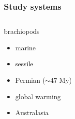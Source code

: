 \documentclass{beamer}
\begin{document}
\begin{frame}
  \frametitle{Study systems}

  \begin{columns}
    \begin{column}{0.5\textwidth}
      \begin{block}{brachiopods}
        \begin{itemize}
          \item marine
          \item sessile
          \item Permian (\(\sim 47\) My)
          \item global warming
          \item Australasia
        \end{itemize}
      \end{block}


\end{column}
\end{columns}
\end{frame}
\end{document}

